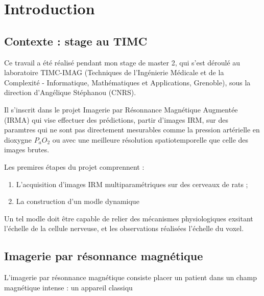 \section{Introduction}

\subsection{Contexte : stage au TIMC}

Ce travail a \'et\'e r\'ealis\'e pendant mon stage de master 2, qui s'est d\'eroul\'e au laboratoire TIMC-IMAG %
(Techniques de l'Ingénierie M\'edicale et de la Complexit\'e - Informatique, Mathématiques et Applications, Grenoble), %
sous la direction d'Angélique Stéphanou (CNRS). 

\par
Il s'inscrit dans le projet Imagerie par Résonnance Magn\'etique Augment\'ee (IRMA) qui vise  effectuer des pr\'edictions, %
 partir d'images IRM, sur des paramtres qui ne sont pas directement mesurables comme la pression art\'erielle en dioxygne $P_aO_2$ %
ou avec une meilleure r\'esolution spatiotemporelle que celle des images brutes.

\par
Les premires \'etapes du projet comprennent :
\begin{enumerate}
\item L'acquisition d'images IRM multiparam\'etriques sur des cerveaux de rats ;
\item La construction d'un modle dynamique 
\end{enumerate}

Un tel modle doit \^etre capable de relier des m\'ecanismes physiologiques exsitant  l'\'echelle de la cellule nerveuse, %
et les observations r\'ealis\'ees  l'\'echelle du voxel.







\subsection{Imagerie par r\'esonnance magn\'etique}%

L'imagerie par r\'esonnance magn\'etique consiste  placer un patient dans un champ magn\'etique intense : %
un appareil classiqu




